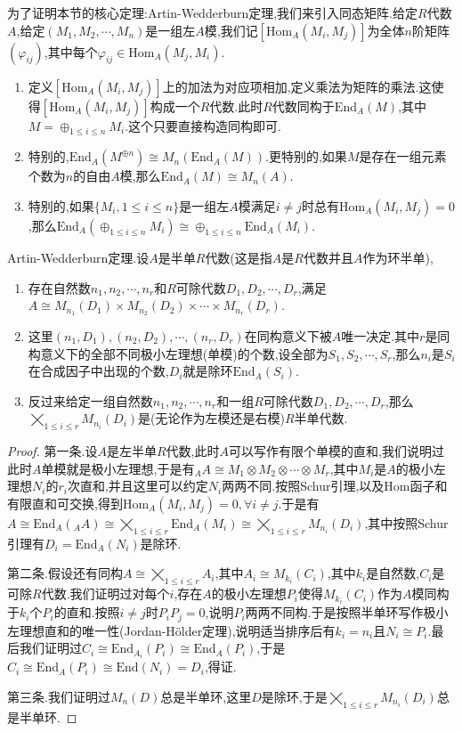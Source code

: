 为了证明本节的核心定理:Artin-Wedderburn定理,我们来引入同态矩阵.给定$R$代数$A$,给定$(M_1,M_2,\cdots,M_n)$是一组左$A$模,我们记$[\mathrm{Hom}_A(M_i,M_j)]$为全体$n$阶矩阵$(\varphi_{ij})$,其中每个$\varphi_{ij}\in\mathrm{Hom}_A(M_j,M_i)$.
\begin{enumerate}
	\item 定义$[\mathrm{Hom}_A(M_i,M_j)]$上的加法为对应项相加,定义乘法为矩阵的乘法.这使得$[\mathrm{Hom}_A(M_i,M_j)]$构成一个$R$代数.此时$R$代数同构于$\mathrm{End}_A(M)$,其中$M=\oplus_{1\le i\le n}M_i$.这个只要直接构造同构即可.
	\item 特别的,$\mathrm{End}_A(M^{\oplus n})\cong M_n(\mathrm{End}_A(M))$.更特别的,如果$M$是存在一组元素个数为$n$的自由$A$模,那么$\mathrm{End}_A(M)\cong M_n(A)$.
	\item 特别的,如果$\{M_i,1\le i\le n\}$是一组左$A$模满足$i\not=j$时总有$\mathrm{Hom}_A(M_i,M_j)=0$,那么$\mathrm{End}_A(\oplus_{1\le i\le n}M_i)\cong\oplus_{1\le i\le n}\mathrm{End}_A(M_i)$.
\end{enumerate}

Artin-Wedderburn定理.设$A$是半单$R$代数(这是指$A$是$R$代数并且$A$作为环半单),
\begin{enumerate}
	\item 存在自然数$n_1,n_2,\cdots,n_r$和$R$可除代数$D_1,D_2,\cdots,D_r$,满足$A\cong M_{n_1}(D_1)\times M_{n_2}(D_2)\times\cdots\times M_{n_r}(D_r)$.
	\item 这里$(n_1,D_1),(n_2,D_2),\cdots,(n_r,D_r)$在同构意义下被$A$唯一决定.其中$r$是同构意义下的全部不同极小左理想(单模)的个数,设全部为$S_1,S_2,\cdots,S_r$,那么$n_i$是$S_i$在合成因子中出现的个数,$D_i$就是除环$\mathrm{End}_A(S_i)$.
	\item 反过来给定一组自然数$n_1,n_2,\cdots,n_r$和一组$R$可除代数$D_1,D_2,\cdots,D_r$,那么$\bigtimes_{1\le i\le r}M_{n_i}(D_i)$是(无论作为左模还是右模)$R$半单代数.
\end{enumerate}
\begin{proof}
	
	第一条.设$A$是左半单$R$代数,此时$A$可以写作有限个单模的直和,我们说明过此时$A$单模就是极小左理想,于是有$_AA\cong M_1\otimes M_2\otimes\cdots\otimes M_r$,其中$M_i$是$A$的极小左理想$N_i$的$r_i$次直和,并且这里可以约定$N_i$两两不同.按照Schur引理,以及Hom函子和有限直和可交换,得到$\mathrm{Hom}_A(M_i,M_j)=0,\forall i\not=j$.于是有$A\cong\mathrm{End}_A(_AA)\cong\bigtimes_{1\le i\le r}\mathrm{End}_A(M_i)\cong\bigtimes_{1\le i\le r}M_{n_i}(D_i)$,其中按照Schur引理有$D_i=\mathrm{End}_A(N_i)$是除环.
	
	第二条.假设还有同构$A\cong\bigtimes_{1\le i\le r}A_i$,其中$A_i\cong M_{k_i}(C_i)$,其中$k_i$是自然数,$C_i$是可除$R$代数.我们证明过对每个$i$,存在$A$的极小左理想$P_i$使得$M_{k_i}(C_i)$作为$A$模同构于$k_i$个$P_i$的直和.按照$i\not=j$时$P_iP_j=0$,说明$P_i$两两不同构.于是按照半单环写作极小左理想直和的唯一性(Jordan-H\"older定理),说明适当排序后有$k_i=n_i$且$N_i\cong P_i$.最后我们证明过$C_i\cong\mathrm{End}_{A_i}(P_i)\cong\mathrm{End}_A(P_i)$,于是$C_i\cong\mathrm{End}_A(P_i)\cong\mathrm{End}(N_i)=D_i$,得证.
	
	第三条.我们证明过$M_n(D)$总是半单环,这里$D$是除环,于是$\bigtimes_{1\le i\le r}M_{n_i}(D_i)$总是半单环.
\end{proof}


